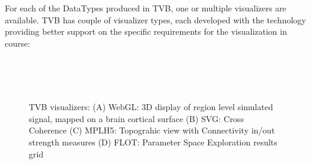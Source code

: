For each of the DataTypes produced in TVB, one or multiple visualizers are available.	
TVB has couple of  visualizer types, each developed with the technology providing better support on the specific requirements for the visualization in course:

 \begin{figure}[!htbp]
	\\
	\\
	\\
	\caption{TVB visualizers: 
	(A) WebGL: 3D display of region level simulated signal, mapped on a brain cortical surface
	(B) SVG: Cross Coherence
	(C) MPLH5:  Topograhic view with Connectivity in/out strength measures
	(D) FLOT: Parameter Space Exploration results grid}
        \label{fig:viewers}
\end{figure}

